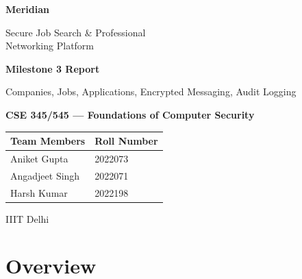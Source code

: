 \documentclass[12pt, a4paper]{article}
\begin{document}
\begin{titlepage}
    \centering
    \vspace*{2cm}

    {\Huge\bfseries\textcolor{meridiandark}{Meridian}\par}
    \vspace{0.5cm}
    {\Large\textcolor{meridianblue}{Secure Job Search \& Professional\\Networking Platform}\par}

    \vspace{1.5cm}

    {\LARGE\textbf{Milestone 3 Report}\par}
    \vspace{0.3cm}
    {\large Companies, Jobs, Applications, Encrypted Messaging, Audit Logging\par}

    \vspace{1.5cm}

    {\large\textbf{CSE 345/545 — Foundations of Computer Security}\par}

    \vspace{1.5cm}

    \begin{tabular}{ll}
        \toprule
        \textbf{Team Members} & \textbf{Roll Number} \\
        \midrule
        Aniket Gupta    & 2022073 \\
        Angadjeet Singh & 2022071 \\
        Harsh Kumar     & 2022198 \\
        \bottomrule
    \end{tabular}

    \vspace{2cm}

    {\large IIIT Delhi\par}
\end{titlepage}

\newpage
\tableofcontents
\newpage

\section{Overview}
\end{document}
